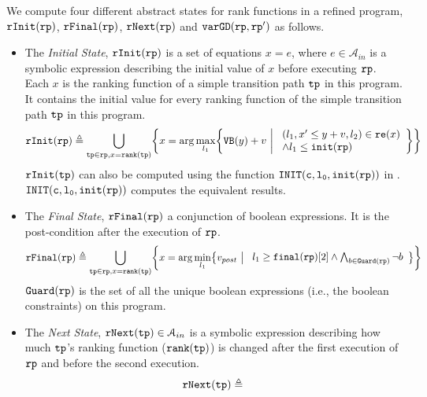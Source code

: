 \begin{defn}
  \label{def:alg-absstate}
  We compute four different abstract states for rank functions in a refined program, $\mathtt{rInit}(\mathtt{rp})$, $\mathtt{rFinal}(\mathtt{rp})$, $\mathtt{rNext}(\mathtt{rp})$ and $\mathtt{varGD}(\mathtt{rp}, \mathtt{rp}')$ as follows.
 \begin{itemize}
  \item The \emph{Initial State}, 
  $\mathtt{rInit}(\mathtt{rp})$ is a set of equations $x = e$, where $e \in \mathcal{A}_{in}$ is a
  symbolic expression describing the initial value of $x$ before executing $\mathtt{rp}$.
  Each $x$ is the ranking function of a simple transition path $\mathtt{tp}$ in this program. 
  It contains the initial value for every ranking function of the simple transition path $\mathtt{tp}$ in this program.
 \[
   \rfinit(\rprog) \triangleq 
   \bigcup_{\tpath \in \rprog, x = \locbound(\tpath)}
   \left \{ 
   x = \arg\max_{l_1}\left\{
     \varinvar(y) + v ~\middle\vert~ 
     \begin{array}{l} 
       (l_1, x' \leq y + v, l_2) \in \reset(x) 
       \\
     \land l_1 \leq \absinit(\rprog)
   \end{array}
   \right\}
   \right\}
   \]
 $\mathtt{rInit}(\mathtt{tp})$ can also be computed using the function $\mathtt{INIT(c, l_0, \mathtt{init}(\mathtt{rp}))}$ in \cite{GulwaniJK09}. 
 $\mathtt{INIT(c, l_0, \mathtt{init}(\mathtt{rp}))}$ computes the equivalent results.
 \item  The \emph{Final State}, $\mathtt{rFinal}(\mathtt{rp})$ a conjunction of boolean expressions.
 It is the post-condition
 after the execution of $\mathtt{rp}$.
 \[
   \rffinal(\rprog) \triangleq 
   \bigcup_{\tpath \in \rprog, x = \locbound(\tpath)}
   \left \{ 
   x = \arg\min_{l_1}\left\{
     v_{post} ~\middle\vert~ 
     \begin{array}{l} 
      l_1 \geq \absfinal(\rprog)[2]
     \land \bigwedge_{b \in \kw{Guard}(\rprog)} \neg b
   \end{array}
   \right\}
   \right\}
   \]
  $\mathtt{Guard}(\mathtt{rp})$ is the set of all the unique boolean expressions (i.e., the boolean constraints) on this program.
 \item The \emph{Next State}, $\mathtt{rNext}(\mathtt{tp}) \in \mathcal{A}_{in}$ 
 is a
 symbolic expression describing how much $\mathtt{tp}$'s ranking function ($\mathtt{rank}(\mathtt{tp})$) is changed after the first execution of $\mathtt{rp}$ and before the second execution.
 \[
   \begin{array}{l}
   \mathtt{rNext}(\mathtt{tp}) \triangleq 
     \begin{array}{l}

\end{array}
\end{array}\]
\end{itemize}
\end{defn}
